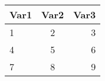 \begin{tabular}{ l | c || r | }
	Var1 & Var2 & Var3 \\
	\hline
	1 & 2 & 3 \\
	4 & 5 & 6 \\
	7 & 8 & 9 \\
\end{tabular}